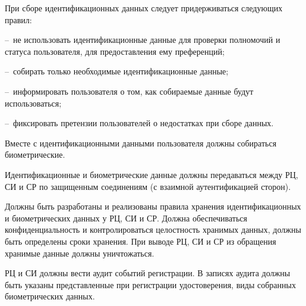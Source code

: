 \begin{note}
При сборе идентификационных данных следует придерживаться следующих правил: 

--~не использовать идентификационные данные для проверки полномочий 
и статуса пользователя, для предоставления ему преференций;

--~собирать только необходимые идентификационные данные;

%

--~информировать пользователя о том, как собираемые данные будут использоваться;

--~фиксировать претензии пользователей о недостатках при сборе данных.
\end{note}


Вместе с идентификационными данными пользователя должны собираться  
биометрические. 

Идентификационные и биометрические данные должны передаваться между
РЦ, СИ и СР по защищенным соединениям (с взаимной аутентификацией сторон).

Должны быть разработаны и реализованы правила хранения идентификационных 
и биометрических данных у РЦ, СИ и СР.
%
Должна обеспечиваться конфиденциальность и контролироваться целостность
хранимых данных, должны быть определены сроки хранения. 
%
При выводе РЦ, СИ и СР из обращения хранимые данные должны уничтожаться.




\label{R.UR.Audit}
РЦ и СИ должны вести аудит событий регистрации. В записях аудита 
должны быть указаны представленные при регистрации удостоверения,
виды собранных биометрических данных.


